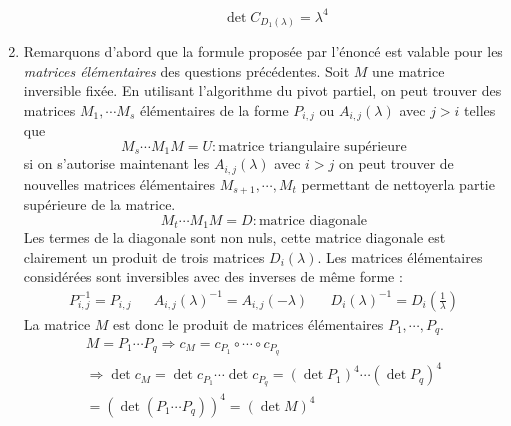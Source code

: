 \begin{enumerate}
\begin{enumerate}
\begin{displaymath}
 \det C_{D_{1}(\lambda)}=\lambda^4
\end{displaymath}
\end{enumerate}
\item Remarquons d'abord que la formule proposée par l'énoncé est valable pour les \emph{matrices élémentaires} des questions précédentes.\newline
Soit $M$ une matrice inversible fixée. En utilisant l'algorithme du pivot partiel, on peut trouver des matrices $M_1, \cdots M_s$ élémentaires de la forme $P_{i,j}$ ou $A_{i,j}(\lambda)$ avec $j>i$ telles que
\begin{displaymath}
 M_s \cdots M_1 M = U : \text{matrice triangulaire supérieure}
\end{displaymath}
si on s'autorise maintenant les $A_{i,j}(\lambda)$ avec $i>j$ on peut trouver de nouvelles matrices élémentaires $M_{s+1},\cdots, M_t$ permettant de \og nettoyer\fg  \phantom{p}la partie supérieure de la matrice.
\begin{displaymath}
 M_t \cdots M_1 M = D : \text{matrice diagonale}
\end{displaymath}
Les termes de la diagonale sont non nuls, cette matrice diagonale est clairement un produit de trois matrices $D_i(\lambda)$. Les matrices élémentaires considérées sont inversibles avec des inverses de même forme :
\begin{align*}
 P_{i,j}^{-1}=P_{i,j} & & A_{i,j}(\lambda)^{-1}= A_{i,j}(-\lambda) & &
D_i(\lambda)^{-1} = D_i(\frac{1}{\lambda})
\end{align*}
La matrice $M$ est donc le produit de matrices élémentaires $P_1,\cdots,P_q$.
\begin{multline*}
 M= P_1\cdots P_q 
\Rightarrow c_M = c_{P_1}\circ \cdots \circ c_{P_q} \\
\Rightarrow \det c_M = \det c_{P_1} \cdots \det c_{P_q}
= (\det P_1)^4 \cdots (\det P_q)^4 \\
= (\det(P_1\cdots P_q))^4
= (\det M )^4
\end{multline*}
\end{enumerate}

